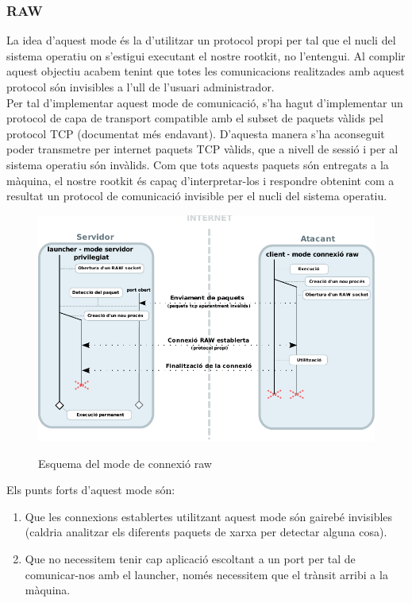 \subsubsection{RAW}

La idea d'aquest mode és la d'utilitzar un protocol propi per tal que el nucli del sistema operatiu on
s'estigui executant el nostre rootkit, no l'entengui. Al complir aquest objectiu acabem tenint que totes les
comunicacions realitzades amb aquest protocol són invisibles a l'ull de l'usuari administrador. \\

Per tal d'implementar aquest mode de comunicació, s'ha hagut d'implementar un protocol de capa de transport 
compatible amb el subset de paquets vàlids pel protocol TCP (documentat més endavant). D'aquesta manera s'ha 
aconseguit poder transmetre per internet paquets TCP vàlids, que a nivell de sessió i per al sistema operatiu són invàlids. 
Com que tots aquests paquets són entregats a la màquina, el nostre rootkit és capaç d'interpretar-los i 
respondre obtenint com a resultat un protocol de comunicació invisible per el nucli del sistema operatiu. \\

\begin{figure}[htp]
    \centering
    \includegraphics[scale=1.2,keepaspectratio]{diagrames/solutionDesignPrivilegedServerModeRAW.pdf} \\
    \caption{Esquema del mode de connexió raw}
    \label{fig:modePrivilegedServerRAW}
\end{figure}

Els punts forts d'aquest mode són: \\
\begin{enumerate}
    \item Que les connexions establertes utilitzant aquest mode són gairebé invisibles (caldria analitzar els
        diferents paquets de xarxa per detectar alguna cosa).
    \item Que no necessitem tenir cap aplicació escoltant a un port per tal de comunicar-nos amb el launcher, només
        necessitem que el trànsit arribi a la màquina. \\
\end{enumerate}

